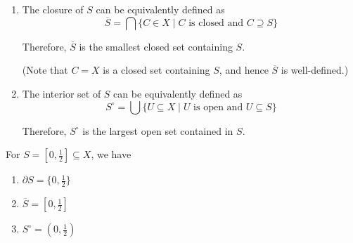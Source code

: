 \begin{proposition}
\begin{enumerate}
\item
The closure of $S$ can be equivalently defined as
\[
\overline{S}=\bigcap\{C\in X\mid\text{$C$ is closed and $C\supseteq S$}\}
\]

Therefore, $\overline{S}$ is the smallest closed set containing $S$.

(Note that $C = X$ is a closed set containing $S$, and hence $\overline{S}$ is well-defined.)
\item
The interior set of $S$ can be equivalently defined as
\[
S^\circ=\bigcup\{U\subseteq X\mid\text{$U$ is open and $U\subseteq S$}\}
\]

Therefore, $S^\circ$ is the largest open set contained in $S$.
\end{enumerate}
\end{proposition}
\begin{example}
For $S=[0,\frac{1}{2}]\subseteq X$, we have
\begin{enumerate}
\item
$\partial S=\{0,\frac{1}{2}\}$
\item
$\overline{S}=[0,\frac{1}{2}]$
\item
$S^\circ=(0,\frac{1}{2})$
\end{enumerate}
\end{example}
